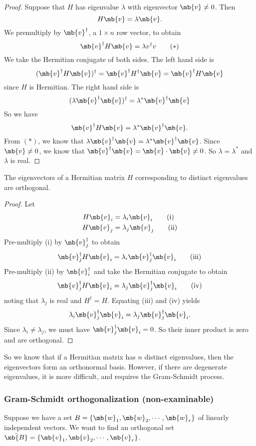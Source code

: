 \documentclass[a4paper]{article}
\begin{document}
\begin{proof}
  Suppose that $H$ has eigenvalue $\lambda$ with eigenvector $\mb{v}\not= 0$. Then
  \[
  H\mb{v} = \lambda\mb{v}.
  \]
We premultiply by $\mb{v}^\dagger$, a $1\times n$ row vector, to obtain
\[
\mb{v}^\dagger H\mb{v} = \lambda v^\dagger v\tag{$*$}\]
We take the Hermitian conjugate of both sides. The left hand side is
\[
(\mb{v}^\dagger H\mb{v})^\dagger = \mb{v}^\dagger H^\dagger \mb{v} = \mb{v}^\dagger H \mb{v}
\]
since $H$ is Hermitian. The right hand side is
\[
(\lambda\mb{v}^\dagger\mb{v})^\dagger = \lambda^* \mb{v}^\dagger \mb{v}
\]
So we have
\[
\mb{v}^\dagger H\mb{v} = \lambda^* \mb{v}^\dagger \mb{v}.
\]
From $(*)$, we know that $\lambda \mb{v}^\dagger \mb{v} = \lambda^* \mb{v}^\dagger \mb{v}$. Since $\mb{v} \not= 0$, we know that $\mb{v}^\dagger \mb{v} = \mb{v}\cdot \mb{v} \not =0$. So $\lambda = \lambda^*$ and $\lambda$ is real.
\end{proof}

\begin{thm}
  The eigenvectors of a Hermitian matrix $H$ corresponding to distinct eigenvalues are orthogonal. 
\end{thm}

\begin{proof}
  Let
  \begin{align*}
    H\mb{v}_i &= \lambda_i\mb{v}_i\tag{i}\\
    H\mb{v}_j &= \lambda_j\mb{v}_j\tag{ii}
  \end{align*}
  Pre-multiply (i) by $\mb{v}_j^\dagger$ to obtain
\[
\mb{v}_j^\dagger H\mb{v}_i = \lambda_i \mb{v}_j^\dagger \mb{v}_i\tag{iii}
\]
  Pre-multiply (ii) by $\mb{v}_i^\dagger$ and take the Hermitian conjugate to obtain
\[
  \mb{v}_j^\dagger H\mb{v}_i = \lambda_j \mb{v}_j^\dagger \mb{v}_i\tag{iv}
\]
noting that $\lambda_j$ is real and $H^\dagger =H$. Equating (iii) and (iv) yields
\[
\lambda_i \mb{v}_j^\dagger \mb{v}_i = \lambda_j \mb{v}_j^\dagger \mb{v}_i.
\]
Since $\lambda_i\not= \lambda_j$, we must have $\mb{v}_j^\dagger\mb{v}_i = 0$. So their inner product is zero and are orthogonal. 
\end{proof}

So we know that if a Hermitian matrix has $n$ distinct eigenvalues, then the eigenvectors form an orthonormal basis. However, if there are degenerate eigenvalues, it is more difficult, and requires the Gram-Schmidt process.

\subsubsection{Gram-Schmidt orthogonalization (non-examinable)}
Suppose we have a set $B = \{\mb{w}_1, \mb{w}_2, \cdots, \mb{w}_r\}$ of linearly independent vectors. We want to find an orthogonal set $\tilde{\mb{B}} = \{\mb{v}_1, \mb{v}_2, \cdots, \mb{v}_r\}$.
\end{document}

